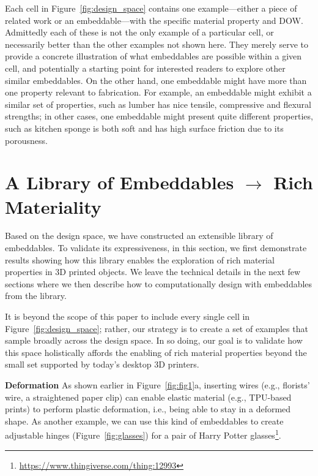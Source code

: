 Each cell in Figure~\ref{fig:design_space} contains one example---either a piece of related work or an embeddable---with the specific material property and DOW. Admittedly each of these is not the only example of a particular cell, or necessarily better than the other examples not shown here. They merely serve to provide a concrete illustration of what embeddables are possible within a given cell, and potentially a starting point for interested readers to explore other similar embeddables. On the other hand, one embeddable might have more than one property relevant to fabrication. For example, an embeddable might exhibit a similar set of properties, such as lumber has nice tensile, compressive and flexural strengths; in other cases, one embeddable might present quite different properties, such as kitchen sponge is both soft and has high surface friction due to its porousness.



\section{A Library of Embeddables $\mathbf{\rightarrow}$ Rich Materiality}
Based on the design space, we have constructed an extensible library of embeddables. To validate its expressiveness, in this section, we first demonstrate results showing how this library enables the exploration of rich material properties in 3D printed objects. We leave the technical details in the next few sections where we then describe how to computationally design with embeddables from the library.


It is beyond the scope of this paper to include every single cell in Figure~\ref{fig:design_space}; rather, our strategy is to create a set of examples that sample broadly across the design space. In so doing, our goal is to validate how this space holistically affords the enabling of rich material properties beyond the small set supported by today's desktop 3D printers.

\textbf{Deformation} As shown earlier in Figure~\ref{fig:fig1}a, inserting wires (e.g., florists' wire, a straightened paper clip) can enable elastic material (e.g., TPU-based prints) to perform plastic deformation, i.e., being able to stay in a deformed shape. As another example, we can use this kind of embeddables to create adjustable hinges (Figure~\ref{fig:glasses}) for a pair of Harry Potter glasses\footnote{\url{https://www.thingiverse.com/thing:12993}}.

